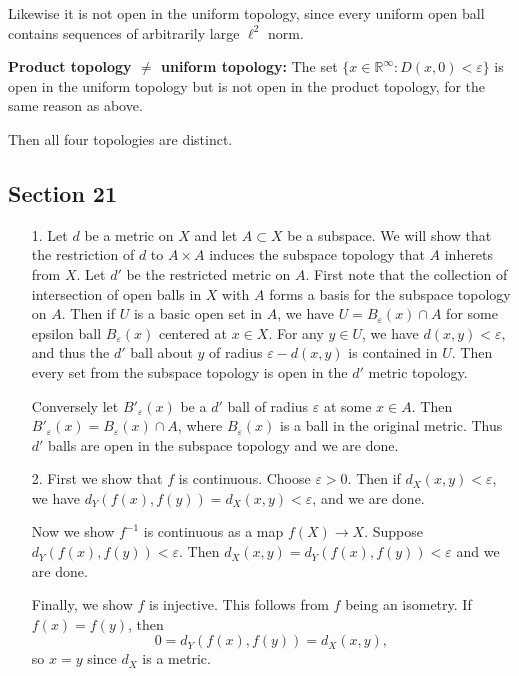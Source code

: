 \documentclass[11pt, reqno]{article}
\theoremstyle{plain}
\theoremstyle{definition}
\theoremstyle{remark}
\renewcommand{\epsilon}{\varepsilon}
\newcommand{\RR}{\mathbb{R}}
\begin{document}
\begin{enumerate}
    Likewise it is not open in the uniform topology, since every uniform open ball contains sequences of arbitrarily 
    large $\ell^2$ norm.

    \textbf{Product topology $\neq$ uniform topology:}
    The set $\{x \in \RR^\infty: D(x,0) < \epsilon\}$ is open in the uniform topology but is not open in the product topology,
    for the same reason as above. 

    Then all four topologies are distinct.
    
\end{enumerate}

\subsection*{Section 21}

\begin{enumerate}
    \item[1.] Let $d$ be a metric on $X$ and let $A \subset X$ be a subspace. We will show that the restriction of $d$
    to $A \times A$ induces the subspace topology that $A$ inherets from $X$. Let $d'$ be the restricted metric on $A$.
    \bigbreak
    First note that the collection of intersection of open balls in $X$ with $A$ forms a basis for the subspace topology
    on $A$. Then if $U$ is a basic open set in $A$, we have $U = B_\epsilon(x) \cap A$ for some epsilon ball 
    $B_\epsilon(x)$ centered at $x \in X$. For any $y \in U$, we have $d(x,y) < \epsilon$, and thus 
    the $d'$ ball about $y$ of radius $\epsilon - d(x,y)$ is contained in $U$. Then every set from the subspace 
    topology is open in the $d'$ metric topology. 

    Conversely let $B'_\epsilon(x)$ be a $d'$ ball of radius $\epsilon$ at some $x \in A$. Then
    $B'_\epsilon(x) = B_\epsilon(x) \cap A$, where $B_\epsilon(x)$ is a ball in the original metric. Thus $d'$ balls
    are open in the subspace topology and we are done. 

    \item[2.] First we show that $f$ is continuous. Choose $\epsilon > 0$. Then if $d_X(x,y) < \epsilon$, we have
    $d_Y(f(x), f(y)) = d_X(x,y) < \epsilon$, and we are done. 

    Now we show $f^{-1}$ is continuous as a map $f(X) \rightarrow X$. Suppose $d_Y(f(x), f(y)) < \epsilon$.
    Then $d_X(x,y) = d_Y(f(x), f(y)) < \epsilon$ and we are done. 

    Finally, we show $f$ is injective. This follows from $f$ being an isometry. If $f(x) = f(y)$, then 
    \[
        0 = d_Y(f(x), f(y)) = d_X(x,y),
    \]
    so $x = y$ since $d_X$ is a metric. 


\end{enumerate}
\end{document}
